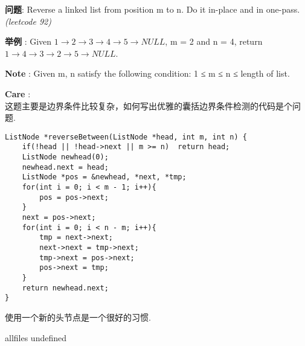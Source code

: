 \documentclass{article}
\begin{document}
\begin{CJK}{UTF8}{gbsn}     %

\else
    
\begin{description}
    \item{\textbf{问题}}: Reverse a linked list from position m to n. Do it in-place and in one-pass. \textit{(leetcode 92)}
	\item{\textbf{举例}} : Given $1\rightarrow2\rightarrow3\rightarrow4\rightarrow5\rightarrow NULL$, m = 2 and n = 4, return $1\rightarrow4\rightarrow3\rightarrow2\rightarrow5\rightarrow NULL$.
    \item{\textbf{Note}} : Given m, n satisfy the following condition: 1 ≤ m ≤ n ≤ length of list.
    \item{\textbf{Care}} : 
    \\这题主要是边界条件比较复杂，如何写出优雅的囊括边界条件检测的代码是个问题.
    \begin{lstlisting}
ListNode *reverseBetween(ListNode *head, int m, int n) {
	if(!head || !head->next || m >= n)	return head;
	ListNode newhead(0);
	newhead.next = head;
	ListNode *pos = &newhead, *next, *tmp;
	for(int i = 0; i < m - 1; i++){
		pos = pos->next;
	}
	next = pos->next;
	for(int i = 0; i < n - m; i++){
		tmp = next->next;
		next->next = tmp->next;
		tmp->next = pos->next;
		pos->next = tmp;
	}
	return newhead.next;
}
    \end{lstlisting}
	使用一个新的头节点是一个很好的习惯.
\end{description}

\fi

\ifx allfiles undefined
\end{CJK}
\end{document}
